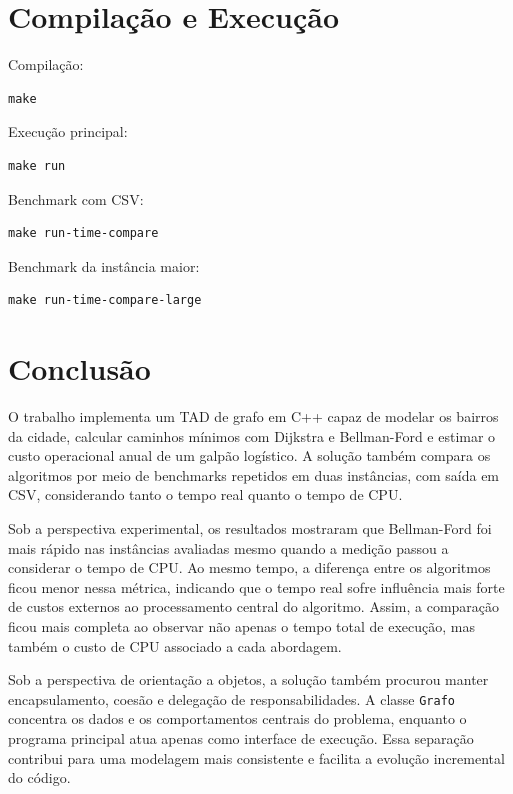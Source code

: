 \documentclass[12pt,a4paper]{article}
\begin{document}
\section{Compilação e Execução}

Compilação:

\begin{lstlisting}
make
\end{lstlisting}

Execução principal:

\begin{lstlisting}
make run
\end{lstlisting}

Benchmark com CSV:

\begin{lstlisting}
make run-time-compare
\end{lstlisting}

Benchmark da instância maior:

\begin{lstlisting}
make run-time-compare-large
\end{lstlisting}

\section{Conclusão}

O trabalho implementa um TAD de grafo em C++ capaz de modelar os bairros da
cidade, calcular caminhos mínimos com Dijkstra e Bellman-Ford e estimar o
custo operacional anual de um galpão logístico. A solução também compara os
algoritmos por meio de benchmarks repetidos em duas instâncias, com saída em
CSV, considerando tanto o tempo real quanto o tempo de CPU.

Sob a perspectiva experimental, os resultados mostraram que Bellman-Ford foi
mais rápido nas instâncias avaliadas mesmo quando a medição passou a considerar
o tempo de CPU. Ao mesmo tempo, a diferença entre os algoritmos ficou menor
nessa métrica, indicando que o tempo real sofre influência mais forte de custos
externos ao processamento central do algoritmo. Assim, a comparação ficou mais
completa ao observar não apenas o tempo total de execução, mas também o custo
de CPU associado a cada abordagem.

Sob a perspectiva de orientação a objetos, a solução também procurou manter
encapsulamento, coesão e delegação de responsabilidades. A classe
\texttt{Grafo} concentra os dados e os comportamentos centrais do problema,
enquanto o programa principal atua apenas como interface de execução. Essa
separação contribui para uma modelagem mais consistente e facilita a evolução
incremental do código.
\end{document}
